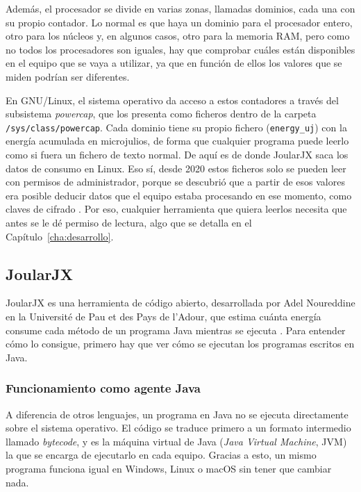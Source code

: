 Además, el procesador se divide en varias zonas, llamadas dominios, cada una con su propio contador. Lo normal es que haya un dominio para el procesador entero, otro para los núcleos y, en algunos casos, otro para la memoria RAM, pero como no todos los procesadores son iguales, hay que comprobar cuáles están disponibles en el equipo que se vaya a utilizar, ya que en función de ellos los valores que se miden podrían ser diferentes.


En GNU/Linux, el sistema operativo da acceso a estos contadores a través del
subsistema \emph{powercap}, que los presenta como ficheros dentro de la carpeta
\texttt{/sys/class/powercap}. Cada dominio tiene su propio fichero
(\texttt{energy\_uj}) con la energía acumulada en microjulios, de forma que
cualquier programa puede leerlo como si fuera un fichero de texto normal. De
aquí es de donde JoularJX saca los datos de consumo en Linux. Eso sí, desde
2020 estos ficheros solo se pueden leer con permisos de administrador, porque
se descubrió que a partir de esos valores era posible deducir datos que el
equipo estaba procesando en ese momento, como claves de cifrado
\cite{lipp2021platypus}. Por eso, cualquier herramienta que quiera leerlos
necesita que antes se le dé permiso de lectura, algo que se detalla en el
Capítulo~\ref{cha:desarrollo}.


\subsection{JoularJX}
\label{subsec:joularjx}

JoularJX es una herramienta de código abierto, desarrollada por Adel Noureddine
en la Université de Pau et des Pays de l'Adour, que estima cuánta energía
consume cada método de un programa Java mientras se ejecuta
\cite{joularjx2022, joularjx3}. Para entender cómo lo consigue, primero hay que
ver cómo se ejecutan los programas escritos en Java.

\subsubsection{Funcionamiento como agente Java}
\label{subsubsec:agente-java}

A diferencia de otros lenguajes, un programa en Java no se ejecuta directamente
sobre el sistema operativo. El código se traduce primero a un formato
intermedio llamado \emph{bytecode}, y es la máquina virtual de Java
(\emph{Java Virtual Machine}, JVM) la que se encarga de ejecutarlo en cada
equipo. Gracias a esto, un mismo programa funciona igual en Windows, Linux o
macOS sin tener que cambiar nada.

